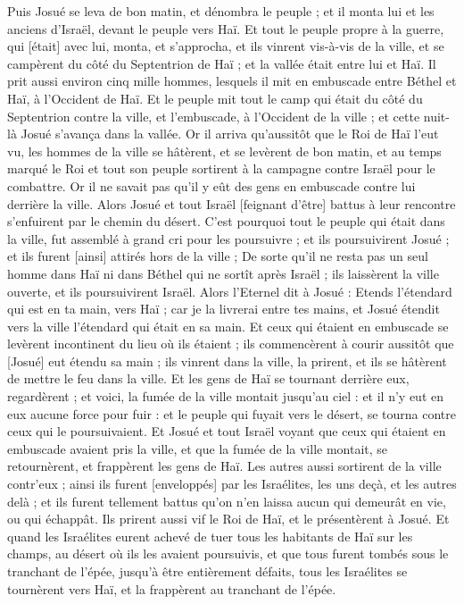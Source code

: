\begin{multicols}{2}
Puis Josué se leva de bon matin, et dénombra le peuple ; et il monta lui et les anciens d'Israël, devant le peuple vers Haï.
Et tout le peuple propre à la guerre, qui [était] avec lui, monta, et s'approcha, et ils vinrent vis-à-vis de la ville, et se campèrent du côté du Septentrion de Haï ; et la vallée était entre lui et Haï.
Il prit aussi environ cinq mille hommes, lesquels il mit en embuscade entre Béthel et Haï, à l'Occident de Haï.
Et le peuple mit tout le camp qui était du côté du Septentrion contre la ville, et l'embuscade, à l'Occident de la ville ; et cette nuit-là Josué s'avança dans la vallée.
Or il arriva qu'aussitôt que le Roi de Haï l'eut vu, les hommes de la ville se hâtèrent, et se levèrent de bon matin, et au temps marqué le Roi et tout son peuple sortirent à la campagne contre Israël pour le combattre. Or il ne savait pas qu'il y eût des gens en embuscade contre lui derrière la ville.
Alors Josué et tout Israël [feignant d'être] battus à leur rencontre s'enfuirent par le chemin du désert.
C'est pourquoi tout le peuple qui était dans la ville, fut assemblé à grand cri pour les poursuivre ; et ils poursuivirent Josué ; et ils furent [ainsi] attirés hors de la ville ;
De sorte qu'il ne resta pas un seul homme dans Haï ni dans Béthel qui ne sortît après Israël ; ils laissèrent la ville ouverte, et ils poursuivirent Israël.
Alors l'Eternel dit à Josué : Etends l'étendard qui est en ta main, vers Haï ; car je la livrerai entre tes mains, et Josué étendit vers la ville l'étendard qui était en sa main.
Et ceux qui étaient en embuscade se levèrent incontinent du lieu où ils étaient ; ils commencèrent à courir aussitôt que [Josué] eut étendu sa main ; ils vinrent dans la ville, la prirent, et ils se hâtèrent de mettre le feu dans la ville.
Et les gens de Haï se tournant derrière eux, regardèrent ; et voici, la fumée de la ville montait jusqu'au ciel : et il n'y eut en eux aucune force pour fuir : et le peuple qui fuyait vers le désert, se tourna contre ceux qui le poursuivaient.
Et Josué et tout Israël voyant que ceux qui étaient en embuscade avaient pris la ville, et que la fumée de la ville montait, se retournèrent, et frappèrent les gens de Haï.
Les autres aussi sortirent de la ville contr'eux ; ainsi ils furent [enveloppés] par les Israélites, les uns deçà, et les autres delà ; et ils furent tellement battus qu'on n'en laissa aucun qui demeurât en vie, ou qui échappât.
Ils prirent aussi vif le Roi de Haï, et le présentèrent à Josué.
Et quand les Israélites eurent achevé de tuer tous les habitants de Haï sur les champs, au désert où ils les avaient poursuivis, et que tous furent tombés sous le tranchant de l'épée, jusqu'à être entièrement défaits, tous les Israélites se tournèrent vers Haï, et la frappèrent au tranchant de l'épée.

\end{multicols}
